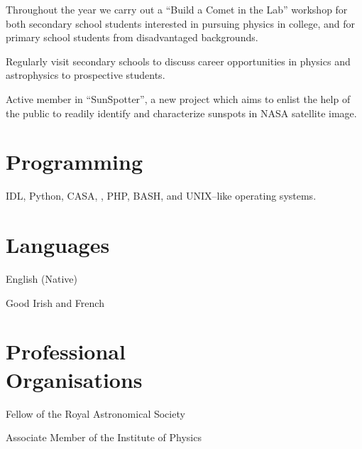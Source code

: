 \documentclass[margin,line]{resume}
\begin{document}
\begin{resume}
	\begin{list2}
    \item Throughout the year we carry out a ``Build a Comet in the Lab'' workshop for both secondary school students interested in pursuing physics in college, and for primary school students from disadvantaged backgrounds.
    \item Regularly visit secondary schools to discuss career opportunities in physics and astrophysics to prospective students.
        \item Active member in ``SunSpotter'', a new project which aims to enlist the help of the public to readily identify and characterize sunspots in NASA satellite image.\vspace{-1mm}\\%
    \end{list2}


    \vspace{0mm}
    \section{\mysidestyle Programming} 

    IDL, Python, CASA, \LaTeXe, PHP, BASH, and UNIX--like operating systems.

    \vspace{0mm}
    \section{\mysidestyle Languages} 
	\begin{list2}
    \item English (Native)
    \item Good Irish and French
    \end{list2}


    \vspace{0mm}
    \section{\mysidestyle Professional\\Organisations} 
	\begin{list2}
    \item Fellow of the Royal Astronomical Society
    \item Associate Member of the Institute of Physics \vspace{-1mm}\\%
    \end{list2}
    

\end{resume}
\end{document}
